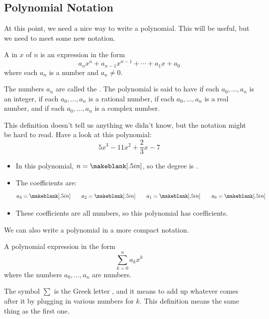 \subsection{Polynomial Notation}
At this point, we need a nice way to write a polynomial. This will be useful, but we need to meet some new notation.
\begin{definition}[Polynomial]
A  in  $x$ of  $n$ is an expression in the form
\[
a_n x^n + a_{n-1} x^{n-1} + \cdots + a_1 x + a_0
\]
where each $a_n$ is a number and $a_n\neq 0$.

The numbers $a_n$ are called the . The polynomial is said to have  if each $a_0,\dots,a_n$ is an integer,  if each $a_0,\dots,a_n$ is a rational number,  if each $a_0,\dots,a_n$ is a real number, and  if each $a_0,\dots,a_n$ is a complex number.
\end{definition}
This definition doesn't tell us anything we didn't know, but the notation might be hard to read. Have a look at this polynomial:
\[
5x^3-11x^2+\frac{2}{3}x-7
\]
\begin{itemize}
\item In this polynomial, $n=\makeblank[.5in]$, so the degree is \makeblank[.5in].
\item The coefficients are:
\[
a_3=\makeblank[.5in]\qquad
a_2=\makeblank[.5in]\qquad
a_1=\makeblank[.5in]\qquad
a_0=\makeblank[.5in]
\]
\item These coefficients are all \makeblank[1.5in] numbers, so this polynomial has \makeblank[1.5in] coefficients.
\end{itemize}
We can also write a polynomial in a more compact notation.
\begin{definition}[Polynomial]
A polynomial expression in the form
\[
\sum_{k=0}^n {a_k x^k}
\]
where the numbers $a_0,\dots,a_n$ are numbers.
\end{definition}
The symbol $\sum{}$ is the Greek letter \makeblank, and it means to add up whatever comes after it by plugging in various numbers for $k$. This definition means the same thing as the first one.
